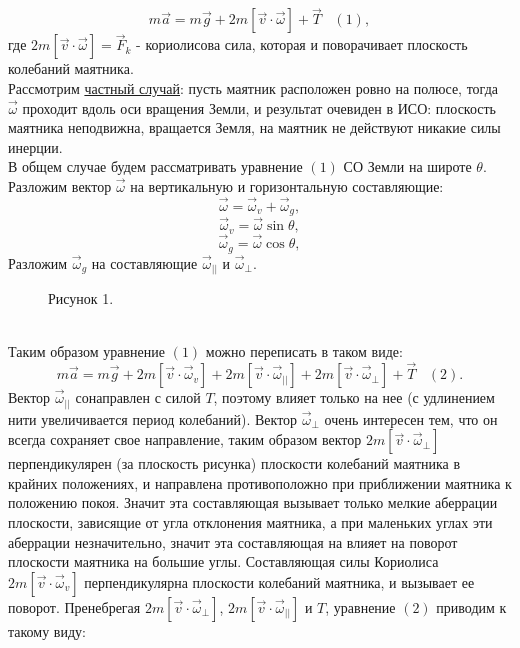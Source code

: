 \documentclass[11pt]{article}
\begin{document}
$$m\vec{a}=m\vec{g}+2m[\vec{v}\cdot\vec{\omega}]+\vec{T}\,\,\,\,\,(1),$$
где $2m[\vec{v}\cdot\vec{\omega}]=\vec{F}_k$ - кориолисова сила, которая и поворачивает плоскость колебаний маятника.\\
Рассмотрим \underline{частный случай}: пусть маятник расположен ровно на полюсе, тогда $\vec{\omega}$ проходит вдоль оси вращения Земли, и результат очевиден в ИСО: плоскость маятника неподвижна, вращается Земля, на маятник не действуют никакие  силы инерции.\\
В общем случае будем рассматривать уравнение $(1)$ СО Земли на широте $\theta$. Разложим вектор $\vec{\omega}$ на вертикальную и горизонтальную составляющие:\\
$$\vec{\omega}=\vec{\omega}_{v}+\vec{\omega}_{g},$$
$$\vec{\omega}_{v}=\vec{\omega}\sin\theta,$$
$$\vec{\omega}_{g}=\vec{\omega}\cos\theta,$$
Разложим $\vec{\omega}_{g}$ на составляющие $\vec{\omega}_{||}$ и $\vec{\omega}_{\perp}$.\\
\begin{figure}[bh]
	\noindent{}
	\caption{Рисунок 1.}
	\label{figCurves}
\end{figure}
\\
Таким образом уравнение $(1)$ можно переписать в таком виде:
$$m\vec{a}=m\vec{g}+2m[\vec{v}\cdot\vec{\omega}_{v}]+2m[\vec{v}\cdot\vec{\omega}_{||}]+2m[\vec{v}\cdot\vec{\omega}_{\perp}]+\vec{T}\,\,\,\,\,(2).$$
Вектор $\vec{\omega}_{||}$ сонаправлен с силой $T$, поэтому влияет только на нее (с удлинением нити увеличивается период колебаний). Вектор $\vec{\omega}_{\perp}$ очень интересен тем, что он всегда сохраняет свое направление, таким образом вектор $2m[\vec{v}\cdot\vec{\omega}_{\perp}]$ перпендикулярен (за плоскость рисунка) плоскости колебаний маятника в крайних положениях, и направлена противоположно при приближении маятника к положению покоя. Значит эта составляющая вызывает только мелкие аберрации плоскости, зависящие от угла отклонения маятника, а при маленьких углах эти аберрации незначительно, значит эта составляющая на влияет на поворот плоскости маятника на большие углы. Составляющая силы Кориолиса $2m[\vec{v}\cdot\vec{\omega}_{v}]$ перпендикулярна плоскости колебаний маятника, и вызывает ее поворот. Пренебрегая $2m[\vec{v}\cdot\vec{\omega}_{\perp}]$, $2m[\vec{v}\cdot\vec{\omega}_{||}]$ и $T$,  уравнение $(2)$ приводим к такому виду:\\
\end{document}
